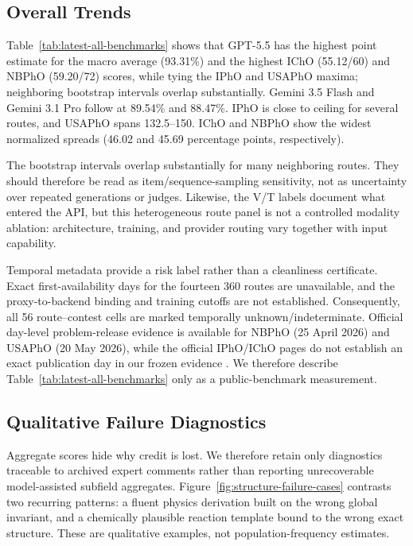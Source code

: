 \documentclass[11pt]{article}
\begin{document}
\subsection{Overall Trends}
Table~\ref{tab:latest-all-benchmarks} shows that GPT-5.5 has the highest point estimate for the macro average (93.31\%) and the highest IChO (55.12/60) and NBPhO (59.20/72) scores, while tying the IPhO and USAPhO maxima; neighboring bootstrap intervals overlap substantially. Gemini 3.5 Flash and Gemini 3.1 Pro follow at 89.54\% and 88.47\%. IPhO is close to ceiling for several routes, and USAPhO spans 132.5--150. IChO and NBPhO show the widest normalized spreads (46.02 and 45.69 percentage points, respectively).

The bootstrap intervals overlap substantially for many neighboring routes. They should therefore be read as item/sequence-sampling sensitivity, not as uncertainty over repeated generations or judges. Likewise, the V/T labels document what entered the API, but this heterogeneous route panel is not a controlled modality ablation: architecture, training, and provider routing vary together with input capability.

Temporal metadata provide a risk label rather than a cleanliness certificate. Exact first-availability days for the fourteen 360 routes are unavailable, and the proxy-to-backend binding and training cutoffs are not established. Consequently, all 56 route--contest cells are marked temporally unknown/indeterminate. Official day-level problem-release evidence is available for NBPhO (25 April 2026) and USAPhO (20 May 2026), while the official IPhO/IChO pages do not establish an exact publication day in our frozen evidence \citep{ipho2026_official_questions,icho2026_official_problems,nbpho2026_media_metadata,usapho2026_official_news}. We therefore describe Table~\ref{tab:latest-all-benchmarks} only as a public-benchmark measurement.

\subsection{Qualitative Failure Diagnostics}
Aggregate scores hide why credit is lost. We therefore retain only diagnostics traceable to archived expert comments rather than reporting unrecoverable model-assisted subfield aggregates. Figure~\ref{fig:structure-failure-cases} contrasts two recurring patterns: a fluent physics derivation built on the wrong global invariant, and a chemically plausible reaction template bound to the wrong exact structure. These are qualitative examples, not population-frequency estimates.
\end{document}

